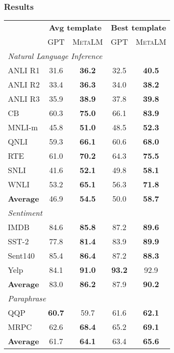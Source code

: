 \documentclass{article}
\theoremstyle{plain}
\theoremstyle{definition}
\theoremstyle{remark}
\newcommand\ours{\textsc{MetaLM}}
\begin{document}
\subsubsection{Results}

\begin{table}[t]
\centering
\begin{tabular}{@{}l c c c c}
\toprule
 & \multicolumn{2}{c}{\textbf{Avg template}} & \multicolumn{2}{c}{\textbf{Best template}} \\
 \cmidrule(r){2-3} \cmidrule(l){4-5}
 & GPT & \ours{} & GPT & \ours{} \\
 \midrule
 \multicolumn{5}{l}{\textit{Natural Language Inference}} \\
ANLI R1 & 31.6 & \textbf{36.2} & 32.5 & \textbf{40.5} \\
ANLI R2 & 33.4 & \textbf{36.3} & 34.0 & \textbf{38.2} \\
ANLI R3 & 35.9 & \textbf{38.9} & 37.8 & \textbf{39.8} \\
CB & 60.3 & \textbf{75.0} & 66.1 & \textbf{83.9} \\
MNLI-m & 45.8 & \textbf{51.0} & 48.5 & \textbf{52.3} \\
QNLI & 59.3 & \textbf{66.1} & 60.6 & \textbf{68.0} \\
RTE & 61.0 & \textbf{70.2} & 64.3 & \textbf{75.5} \\
SNLI & 41.6 & \textbf{52.1} & 49.8 & \textbf{58.1} \\
WNLI & 53.2 & \textbf{65.1} & 56.3 & \textbf{71.8} \\
\textbf{Average} & 46.9 & \textbf{54.5} & 50.0 & \textbf{58.7} \\

 \midrule
 \multicolumn{5}{l}{\textit{{Sentiment}}} \\
IMDB & 84.6 & \textbf{85.8} & 87.2 & \textbf{89.6} \\
SST-2 & 77.8 & \textbf{81.4} & 83.9 & \textbf{89.9} \\
Sent140 & 85.4 & \textbf{86.4} & 87.2 & \textbf{88.3} \\
Yelp & 84.1 & \textbf{91.0} & \textbf{93.2} & 92.9 \\
\textbf{Average} & 83.0 & \textbf{86.2} & 87.9 & \textbf{90.2} \\

 \midrule
 \multicolumn{5}{l}{\textit{{Paraphrase}}} \\
QQP & \textbf{60.7} & 59.7 & 61.6 & \textbf{62.1} \\
MRPC & 62.6 & \textbf{68.4} & 65.2 & \textbf{69.1} \\
\textbf{Average} & 61.7 & \textbf{64.1} & 63.4 & \textbf{65.6} \\


\end{tabular}
\end{table}
\end{document}
